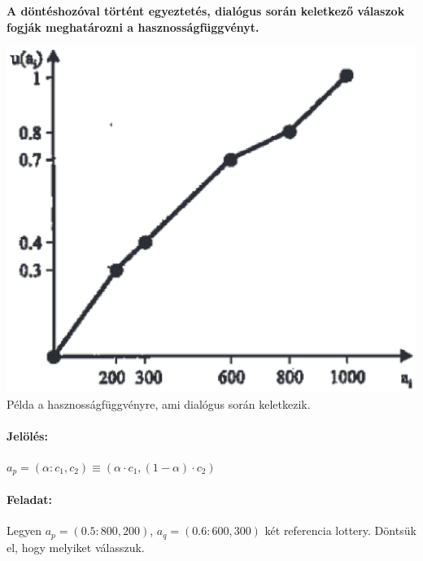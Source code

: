 \documentclass[a4paper,12pt]{article}
\begin{document}
\textbf{A döntéshozóval történt egyeztetés, dialógus során keletkező válaszok fogják meghatározni a hasznosságfüggvényt.}

\begin{center}

\includegraphics[scale=0.7]{utilmake}
\\
Példa a hasznosságfüggvényre, ami dialógus során keletkezik.
\end{center}

\paragraph{Jelölés: } $a_p = (\alpha: c_1, c_2) \equiv (\alpha \cdot c_1, (1-\alpha) \cdot c_2) $

\paragraph{Feladat: } Legyen $a_p = (0.5:800, 200)$, $a_q = (0.6:600, 300)$ két referencia lottery. Döntsük el, hogy melyiket válasszuk. 
\end{document}
